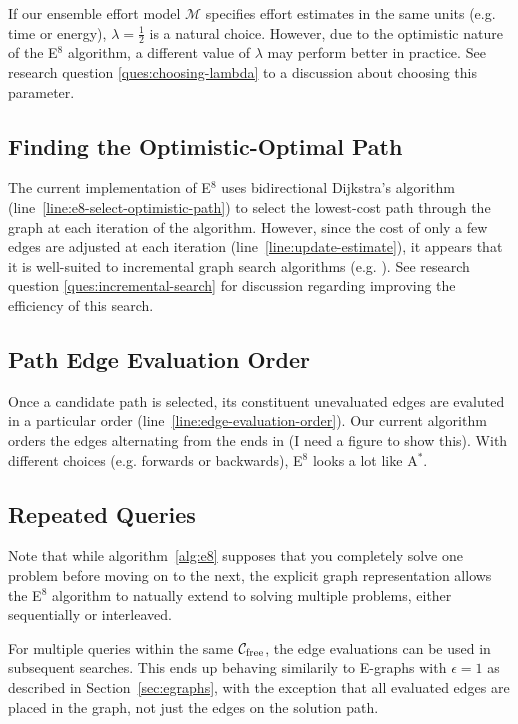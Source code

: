 If our ensemble effort model $\mathcal{M}$
specifies effort estimates in the same units
(e.g. time or energy),
$\lambda=\frac{1}{2}$ is a natural choice.
However,
due to the optimistic nature of the E$^8$ algorithm,
a different value of $\lambda$ may perform better in practice.
See research question \ref{ques:choosing-lambda}
to a discussion about choosing this parameter.

\subsection{Finding the Optimistic-Optimal Path}
\label{subsec:search-each-iteration}

The current implementation of E$^8$ uses
bidirectional Dijkstra's algorithm
(line~\ref{line:e8-select-optimistic-path})
to select the lowest-cost path through the graph
at each iteration of the algorithm.
However, since the cost of only a few edges
are adjusted at each iteration (line~\ref{line:update-estimate}),
it appears that it is well-suited to incremental
graph search algorithms (e.g. \cite{koenig2004lpastar}).
See research question \ref{ques:incremental-search}
for discussion regarding improving the efficiency of this search.

\subsection{Path Edge Evaluation Order}
\label{subsec:alg-path-evaluation}

Once a candidate path is selected,
its constituent unevaluated edges are evaluted
in a particular order (line~\ref{line:edge-evaluation-order}).
Our current algorithm
orders the edges alternating from the ends in
(I need a figure to show this).
With different choices (e.g. forwards or backwards),
E$^8$ looks a lot like A$^*$.

\subsection{Repeated Queries}

Note that while
algorithm~\ref{alg:e8} supposes that you completely solve
one problem before moving on to the next,
the explicit graph representation
allows the E$^8$ algorithm
to natually extend to solving multiple problems,
either sequentially or interleaved.

For multiple queries within the same
$\mathcal{C}_{\mbox{\scriptsize free}}$,
the edge evaluations can be used in subsequent searches.
This ends up behaving similarily to E-graphs \cite{phillips2012egraphs}
with $\epsilon=1$
as described in Section~\ref{sec:egraphs},
with the exception that all evaluated edges are placed in the graph,
not just the edges on the solution path.

